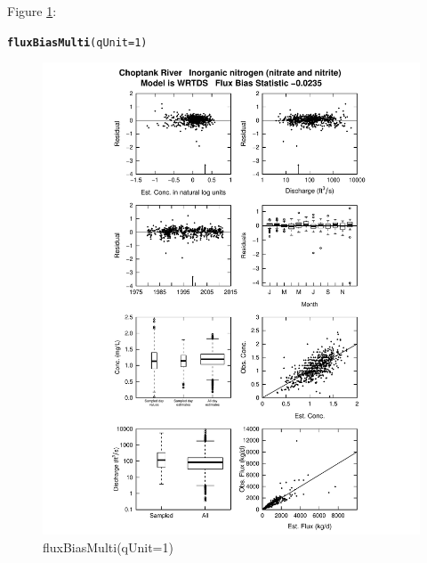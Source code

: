\documentclass[a4paper,11pt]{article}\usepackage{graphicx, color}
\makeatletter
\def\maxwidth{ %
  \ifdim\Gin@nat@width>\linewidth
    \linewidth
  \else
    \Gin@nat@width
  \fi
}
\newcommand{\hlfunctioncall}[1]{\textcolor[rgb]{0.501960784313725,0,0.329411764705882}{\textbf{#1}}}%
\newenvironment{kframe}{%
 \def\at@end@of@kframe{}%
 \ifinner\ifhmode%
  \def\at@end@of@kframe{\end{minipage}}%
  \begin{minipage}{\columnwidth}%
 \fi\fi%
 \def\FrameCommand##1{\hskip\@totalleftmargin \hskip-\fboxsep
 \colorbox{shadecolor}{##1}\hskip-\fboxsep
     \hskip-\linewidth \hskip-\@totalleftmargin \hskip\columnwidth}%
 \MakeFramed {\advance\hsize-\width
   \@totalleftmargin\z@ \linewidth\hsize
   \@setminipage}}%
 {\par\unskip\endMakeFramed%
 \at@end@of@kframe}
\newenvironment{knitrout}{}{} %
\makeatother
\begin{document}
Figure \ref{fig:fluxBiasMulti}:
\begin{knitrout}
\color{fgcolor}\begin{kframe}
\begin{alltt}
\hlfunctioncall{fluxBiasMulti}(qUnit=1)
\end{alltt}
\end{kframe}\begin{figure}[]

\includegraphics[width=\maxwidth]{figure/fluxBiasMulti} \caption[fluxBiasMulti(qUnit=1)]{fluxBiasMulti(qUnit=1)\label{fig:fluxBiasMulti}}
\end{figure}


\end{knitrout}
\end{document}
